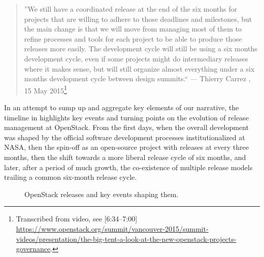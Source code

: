 \begin{quotation} 
\footnotesize
 ''We still have a coordinated release at the end of the six months for projects that are willing to adhere to those deadlines and milestones, but the main change is that we will move from managing most of them to refine processes and tools for each project to be able to produce those releases more easily. The development cycle will still be using a six months development cycle, even if some projects might do intermediary releases where it makes sense, but will still organize almost everything under a six months development cycle between design summits.`` --- Thierry Carrez , 15 May 2015\footnote{Transcribed from video, see [6:34--7:00] \url{https://www.openstack.org/summit/vancouver-2015/summit-videos/presentation/the-big-tent-a-look-at-the-new-openstack-projects-governance}.}
\end{quotation}

% 


In an attempt to sump up and aggregate key elements of our narrative,  the timeline in  highlights key events and turning points on the evolution of release management at OpenStack. From the first days, when the overall development was shaped by the official software development processes institutionalized  at NASA, then the spin-off as an open-source project with releases at every three months,  then the shift towards a more liberal release cycle of six months, and later,  after a period of much growth, the co-existence of multiple release models trailing a common six-month release cycle. 



\begin{figure}[!ht]
 
\centering

  \caption{OpenStack releases and key events shaping them.}
 \label{fig:process-timeline}
\end{figure}

